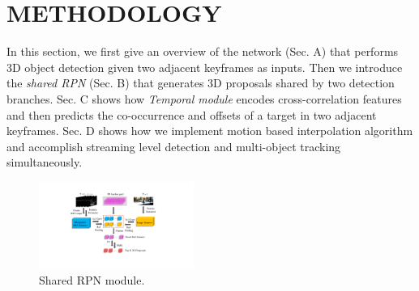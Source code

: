 \documentclass[letterpaper, 10pt, conference]{ieeeconf}  %
\begin{document}
\section{METHODOLOGY}

In this section, we first give an overview of the network (Sec. A) that performs 3D object detection given two adjacent keyframes as inputs. Then we introduce the \textit{shared RPN} (Sec. B) that generates 3D proposals shared by two detection branches. Sec. C shows how \textit{Temporal module} encodes cross-correlation features and then predicts the co-occurrence and offsets of a target in two adjacent keyframes. Sec. D shows how we implement motion based interpolation algorithm and accomplish streaming level detection and multi-object tracking simultaneously.

\begin{figure}
	\rule{0pt}{1ex}
	\begin{center}
		\includegraphics[trim={7cm, 3.5cm, 8cm, 2.5cm}, clip,width=0.45\textwidth]{images/rpn_final.pdf}
	\end{center}
	\caption{Shared RPN module.}
	\label{fig:rpn}
	\vspace{-0.6cm}
\end{figure}
\end{document}
